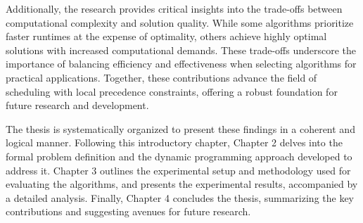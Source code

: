 Additionally, the research provides critical insights into the trade-offs between computational complexity and solution quality. While some algorithms prioritize faster runtimes at the expense of optimality, others achieve highly optimal solutions with increased computational demands. These trade-offs underscore the importance of balancing efficiency and effectiveness when selecting algorithms for practical applications. Together, these contributions advance the field of scheduling with local precedence constraints, offering a robust foundation for future research and development. \hfill \break

The thesis is systematically organized to present these findings in a coherent and logical manner. Following this introductory chapter, Chapter 2 delves into the formal problem definition and the dynamic programming approach developed to address it. Chapter 3 outlines the experimental setup and methodology used for evaluating the algorithms, and presents the experimental results, accompanied by a detailed analysis. Finally, Chapter 4 concludes the thesis, summarizing the key contributions and suggesting avenues for future research.
